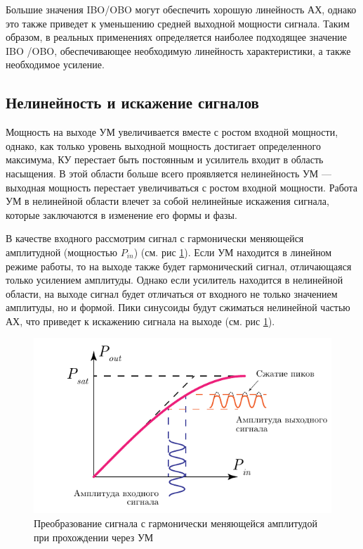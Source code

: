 Большие значения IBO\slash OBO могут обеспечить хорошую линейность АХ,
однако это также приведет к уменьшению средней выходной мощности сигнала.
Таким образом, в реальных применениях определяется наиболее подходящее
значение IBO \slash OBO, обеспечивающее необходимую линейность
характеристики, а также необходимое усиление.


\subsection{Нелинейность и искажение сигналов}
Мощность на выходе УМ увеличивается вместе с ростом входной мощности,
однако, как только уровень выходной мощность достигает определенного
максимума, КУ перестает быть постоянным и усилитель входит в область
насыщения. В этой области больше всего проявляется нелинейность УМ —
выходная мощность перестает увеличиваться с ростом входной мощности. Работа
УМ в нелинейной области влечет за собой нелинейные искажения сигнала,
которые заключаются в изменение его формы и фазы.

В качестве входного рассмотрим сигнал с гармонически меняющейся амплитудной
(мощностью $P_{in}$) (см. рис \ref{fig:pa_distortion_sin}). Если УМ
находится в линейном режиме работы, то на выходе также будет гармонический
сигнал, отличающаяся только усилением амплитуды. Однако если усилитель
находится в нелинейной области, на выходе сигнал будет отличаться от
входного не только значением амплитуды, но и формой. Пики синусоиды будут
сжиматься нелинейной частью АХ, что приведет к искажению сигнала на выходе
(см. рис \ref{fig:pa_distortion_sin}).

\begin{figure}[h!]
    \centering
    \includegraphics[scale=1.2]{figs/amp_dist.pdf}
    \caption{Преобразование сигнала с гармонически меняющейся амплитудой при прохождении через УМ}
    \label{fig:pa_distortion_sin}
\end{figure}

